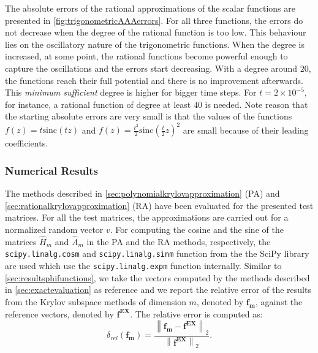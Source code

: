 The absolute errors of the rational approximations of the scalar functions are presented in
\autoref{fig:trigonometricAAAerrors}.
For all three functions, the errors do not decrease when the degree of the rational function is too low.
This behaviour lies on the oscillatory nature of the trigonometric functions. When the degree is increased,
at some point, the rational functions become powerful enough to capture the oscillations and the errors
start decreasing. With a degree around $20$, the functions reach their full potential and there is no
improvement afterwards. This \textit{minimum sufficient} degree is higher for bigger time steps.
For $t = 2 \times 10^{-5}$, for instance, a rational function of degree at least $40$ is needed.
Note reason that the starting absolute errors are very small is that the values of the functions
$f(z)=t \mathrm{sinc}(tz)$ and $f(z)=\frac{t^2}{2} \mathrm{sinc}(\frac{t}{2}z)^2$ are small because
of their leading coefficients.

\FloatBarrier

\subsubsection*{Numerical Results}

The methods described in \autoref{sec:polynomialkrylovapproximation} (PA)
and \autoref{sec:rationalkrylovapproximation} (RA) have been evaluated for the presented test matrices.
For all the test matrices, the approximations are carried out for a normalized random vector $v$.
For computing the cosine and the sine of the matrices $\hat{H}_m$ and $\hat{A}_m$ in the PA and the
RA methods, respectively, the \texttt{scipy.linalg.cosm} and \texttt{scipy.linalg.sinm} function
from the the SciPy library~\cite{SciPy2020} are used which use the \texttt{scipy.linalg.expm}
function internally.
Similar to \autoref{sec:resultsphifunctions}, we take the vectors computed by the methods
described in \autoref{sec:exactevaluation} as reference and we report the relative
error of the results from the Krylov subspace methods of dimension $m$, denoted by
$\mathbf{f_m}$, against the reference vectors, denoted by $\mathbf{f^{EX}}$.
The relative error is computed as:
\begin{equation*}
    \delta_{rel}(\mathbf{f_m}) =
    \frac{\left\| \mathbf{f_m} - \mathbf{f^{EX}} \right\|_2}
    {\left\| \mathbf{f^{EX}} \right\|_2}.
\end{equation*}

